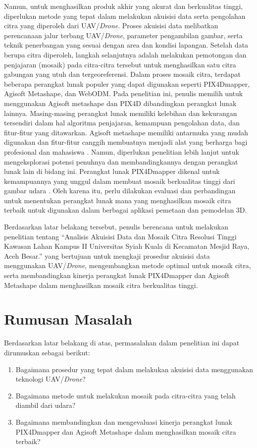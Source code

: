 Namun, untuk menghasilkan produk akhir yang akurat dan berkualitas tinggi, diperlukan metode yang tepat dalam melakukan akuisisi data serta pengolahan citra yang diperoleh dari UAV/\textit{Drone}. Proses akuisisi data melibatkan perencanaan jalur terbang UAV/\textit{Drone}, parameter pengambilan gambar, serta teknik penerbangan yang sesuai dengan area dan kondisi lapangan. Setelah data berupa citra diperoleh, langkah selanjutnya adalah melakukan pemotongan dan penjajaran (mosaik) pada citra-citra tersebut untuk menghasilkan satu citra gabungan yang utuh dan tergeoreferensi. Dalam proses mosaik citra, terdapat beberapa perangkat lunak populer yang dapat digunakan seperti PIX4Dmapper, Agisoft Metashape, dan WebODM. Pada penelitian ini, penulis memilih untuk menggunakan Agisoft metashape dan PIX4D dibandingkan perangkat lunak lainnya. Masing-masing perangkat lunak memiliki kelebihan dan kekurangan tersendiri dalam hal algoritma penjajaran, kemampuan pengolahan data, dan fitur-fitur yang ditawarkan. Agisoft metashape memiliki antarmuka yang mudah digunakan dan fitur-fitur canggih membuatnya menjadi alat yang berharga bagi profesional dan mahasiswa \citep{rozak2020struktur}. Namun, diperlukan penelitian lebih lanjut untuk mengeksplorasi potensi penuhnya dan membandingkannya dengan perangkat lunak lain di bidang ini. Perangkat lunak PIX4Dmapper dikenal untuk kemampuannya yang unggul dalam membuat mosaik berkualitas tinggi dari gambar udara \citep{ardhiman2021rancang}. Oleh karena itu, perlu dilakukan evaluasi dan perbandingan untuk menentukan perangkat lunak mana yang menghasilkan mosaik citra terbaik untuk digunakan dalam berbagai aplikasi pemetaan dan pemodelan 3D. 

Berdasarkan latar belakang tersebut, penulis berencana untuk melakukan penelitian tentang “Analisis Akuisisi Data dan Mosaik Citra Resolusi Tinggi Kawasan Lahan Kampus II Universitas Syiah Kuala di Kecamatan Mesjid Raya, Aceh Besar.” yang bertujuan untuk
mengkaji prosedur akuisisi data menggunakan UAV/\textit{Drone}, mengembangkan metode
optimal untuk mosaik citra, serta membandingkan kinerja perangkat lunak PIX4Dmapper dan Agisoft Metashape dalam menghasilkan mosaik citra berkualitas tinggi.


\section{Rumusan Masalah}
Berdasarkan latar belakang di atas, permasalahan dalam penelitian ini dapat dirumuskan sebagai berikut:
\begin{enumerate}
	\item Bagaimana prosedur yang tepat dalam melakukan akuisisi data menggunakan teknologi UAV/\textit{Drone}?
	\item Bagaimana metode untuk melakukan mosaik pada citra-citra yang telah diambil dari udara?
	\item Bagaimana membandingkan dan mengevaluasi kinerja perangkat lunak PIX4Dmapper dan Agisoft Metashape dalam menghasilkan mosaik citra terbaik?
 
\end{enumerate}

